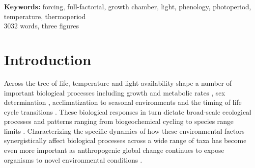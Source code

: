 \documentclass[11pt]{article}
\begin{document}
\textbf{Keywords:}  forcing, full-factorial,  growth chamber, light,  phenology, photoperiod, temperature, thermoperiod \\

3032 words, three figures
\pagebreak
\section*{Introduction}
\noindent Across the tree of life, temperature and light availability shape a number of important biological processes including growth and metabolic rates \citep{MacLean:2019aa}, sex determination \citep{Brown:2014vn}, acclimatization to seasonal environments \citep{Hamilton2016} and the timing of life cycle transitions \citep[i.e., phenology,][]{Forrest2010}. These biological responses in turn dictate broad-scale ecological processes and patterns ranging from biogeochemical cycling \citep{Piao2007} to species range limits \citep{Chuine2001}. Characterizing the specific dynamics of how these environmental factors synergistically affect biological processes across a wide range of taxa has become even more important as anthropogenic global change continues to expose organisms to novel environmental conditions \citep{Portner:2008vd}.
\end{document}
